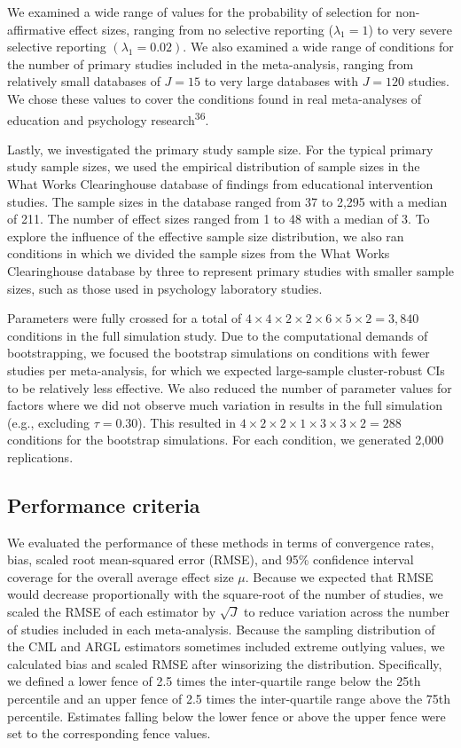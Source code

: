 \documentclass[
  man, donotrepeattitle,floatsintext]{apa7}
\begin{document}
We examined a wide range of values for the probability of selection for non-affirmative effect sizes, ranging from no selective reporting (\(\lambda_1 = 1\)) to very severe selective reporting \((\lambda_1 = 0.02)\).
We also examined a wide range of conditions for the number of primary studies included in the meta-analysis, ranging from relatively small databases of \(J = 15\) to very large databases with \(J = 120\) studies.
We chose these values to cover the conditions found in real meta-analyses of education and psychology research\textsuperscript{36}.

Lastly, we investigated the primary study sample size.
For the typical primary study sample sizes, we used the empirical distribution of sample sizes in the What Works Clearinghouse database of findings from educational intervention studies.
The sample sizes in the database ranged from 37 to 2,295 with a median of 211.
The number of effect sizes ranged from 1 to 48 with a median of 3.
To explore the influence of the effective sample size distribution, we also ran conditions in which we divided the sample
sizes from the What Works Clearinghouse database by three to represent primary studies with smaller sample sizes,
such as those used in psychology laboratory studies.

Parameters were fully crossed for a total of \(4 \times 4 \times 2 \times 2 \times 6 \times 5 \times 2 = 3,840\) conditions in the full simulation study.
Due to the computational demands of bootstrapping, we focused the bootstrap simulations on conditions with fewer studies per meta-analysis, for which we expected large-sample cluster-robust CIs to be relatively less effective.
We also reduced the number of parameter values for factors where we did
not observe much variation in results in the full simulation
(e.g., excluding \(\tau = 0.30\)).
This resulted in \(4 \times 2 \times 2 \times 1 \times 3 \times 3 \times 2 = 288\) conditions for the bootstrap simulations.
For each condition, we generated 2,000 replications.

\subsection{Performance criteria}\label{performance-criteria}

We evaluated the performance of these methods in terms of convergence rates, bias,
scaled root mean-squared error (RMSE), and 95\% confidence interval coverage for the overall average effect size \(\mu\).
Because we expected that RMSE would decrease proportionally with the square-root of the number of studies, we scaled the RMSE of each estimator by \(\sqrt{J}\) to reduce variation across the number of studies included in each meta-analysis.
Because the sampling distribution of the CML and ARGL estimators sometimes included extreme outlying values, we calculated bias and scaled RMSE after winsorizing the distribution.
Specifically, we defined a lower fence of 2.5 times the inter-quartile range below the 25th percentile and an upper fence of 2.5 times the inter-quartile range above the 75th percentile.
Estimates falling below the lower fence or above the upper fence were set to the corresponding fence values.
\end{document}
